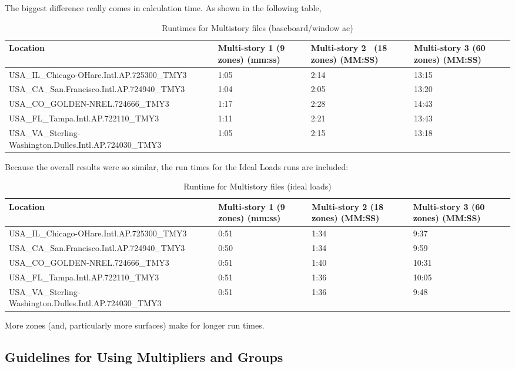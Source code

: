 The biggest difference really comes in calculation time. As shown in the following table,

\begin{longtable}[c]{p{1.5in}p{1.5in}p{1.5in}p{1.5in}}
\caption{Runtimes for Multistory files (baseboard/window ac) \protect \label{table:runtimes-for-multistory-files-baseboardwindow}}\\
\toprule 
Location & Multi-story 1 (9 zones) (mm:ss) & Multi-story 2~ (18 zones) (MM:SS) & Multi-story 3 (60 zones) (MM:SS) \tabularnewline \midrule
\endhead
USA\_IL\_Chicago-OHare.Intl.AP.725300\_TMY3 & 1:05 & 2:14 & 13:15 \tabularnewline
USA\_CA\_San.Francisco.Intl.AP.724940\_TMY3 & 1:04 & 2:05 & 13:20 \tabularnewline
USA\_CO\_GOLDEN-NREL.724666\_TMY3 & 1:17 & 2:28 & 14:43 \tabularnewline
USA\_FL\_Tampa.Intl.AP.722110\_TMY3 & 1:11 & 2:21 & 13:43 \tabularnewline
USA\_VA\_Sterling-Washington.Dulles.Intl.AP.724030\_TMY3 & 1:05 & 2:15 & 13:18 \tabularnewline
\bottomrule
\end{longtable}

Because the overall results were so similar, the run times for the Ideal Loads runs are included:

\begin{longtable}[c]{p{1.5in}p{1.5in}p{1.5in}p{1.5in}}
\caption{Runtime for Multistory files (ideal loads) \protect \label{table:runtime-for-multistory-files-ideal-loads}}\\
\toprule 
Location & Multi-story 1 (9 zones) (mm:ss) & Multi-story 2 (18 zones) (MM:SS) & Multi-story 3 (60 zones) (MM:SS) \tabularnewline \midrule
\endhead
USA\_IL\_Chicago-OHare.Intl.AP.725300\_TMY3 & 0:51 & 1:34 & 9:37 \tabularnewline
USA\_CA\_San.Francisco.Intl.AP.724940\_TMY3 & 0:50 & 1:34 & 9:59 \tabularnewline
USA\_CO\_GOLDEN-NREL.724666\_TMY3 & 0:51 & 1:40 & 10:31 \tabularnewline
USA\_FL\_Tampa.Intl.AP.722110\_TMY3 & 0:51 & 1:36 & 10:05 \tabularnewline
USA\_VA\_Sterling-Washington.Dulles.Intl.AP.724030\_TMY3 & 0:51 & 1:36 & 9:48 \tabularnewline
\bottomrule
\end{longtable}

More zones (and, particularly more surfaces) make for longer run times.

\subsection{Guidelines for Using Multipliers and Groups}\label{guidelines-for-using-multipliers-and-groups}

